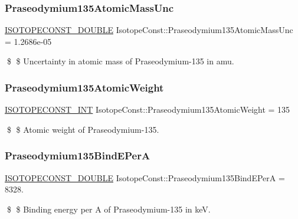 \subsubsection{\texorpdfstring{Praseodymium135\+Atomic\+Mass\+Unc}{Praseodymium135AtomicMassUnc}}
{\footnotesize\ttfamily \mbox{\hyperlink{group___isotope_const-_macros_ga8f45a7272ce02c0b4c65c44636ed719a}{I\+S\+O\+T\+O\+P\+E\+C\+O\+N\+S\+T\+\_\+\+D\+O\+U\+B\+LE}} Isotope\+Const\+::\+Praseodymium135\+Atomic\+Mass\+Unc = 1.\+2686e-\/05}

\$ \$ Uncertainty in atomic mass of Praseodymium-\/135 in amu. \mbox{\label{group___isotope_const-_praseodymium-_pr135_gaa08ec9a97139ab49e2299994e7f19a54}} 
\subsubsection{\texorpdfstring{Praseodymium135\+Atomic\+Weight}{Praseodymium135AtomicWeight}}
{\footnotesize\ttfamily \mbox{\hyperlink{group___isotope_const-_macros_ga5f18360b3e99483a35c32d789e62621c}{I\+S\+O\+T\+O\+P\+E\+C\+O\+N\+S\+T\+\_\+\+I\+NT}} Isotope\+Const\+::\+Praseodymium135\+Atomic\+Weight = 135}

\$ \$ Atomic weight of Praseodymium-\/135. \mbox{\label{group___isotope_const-_praseodymium-_pr135_gaada2a76a185e801fd60b352692220d21}} 
\subsubsection{\texorpdfstring{Praseodymium135\+Bind\+E\+PerA}{Praseodymium135BindEPerA}}
{\footnotesize\ttfamily \mbox{\hyperlink{group___isotope_const-_macros_ga8f45a7272ce02c0b4c65c44636ed719a}{I\+S\+O\+T\+O\+P\+E\+C\+O\+N\+S\+T\+\_\+\+D\+O\+U\+B\+LE}} Isotope\+Const\+::\+Praseodymium135\+Bind\+E\+PerA = 8328.}

\$ \$ Binding energy per A of Praseodymium-\/135 in keV. \mbox{\label{group___isotope_const-_praseodymium-_pr135_gaa2e32c6ea644a5f626e7613ca90091ff}} 
